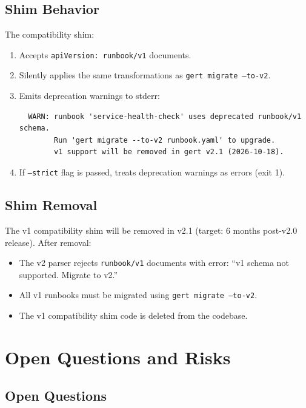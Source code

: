 \subsection{Shim Behavior}

The compatibility shim:
\begin{enumerate}
  \item Accepts \texttt{apiVersion: runbook/v1} documents.
  \item Silently applies the same transformations as \texttt{gert migrate --to-v2}.
  \item Emits deprecation warnings to stderr:
  \begin{verbatim}
  WARN: runbook 'service-health-check' uses deprecated runbook/v1 schema.
        Run 'gert migrate --to-v2 runbook.yaml' to upgrade.
        v1 support will be removed in gert v2.1 (2026-10-18).
  \end{verbatim}
  \item If \texttt{--strict} flag is passed, treats deprecation warnings as errors (exit 1).
\end{enumerate}

\subsection{Shim Removal}

The v1 compatibility shim will be removed in v2.1 (target: 6 months post-v2.0 release). After removal:
\begin{itemize}
  \item The v2 parser rejects \texttt{runbook/v1} documents with error: ``v1 schema not supported. Migrate to v2.''
  \item All v1 runbooks must be migrated using \texttt{gert migrate --to-v2}.
  \item The v1 compatibility shim code is deleted from the codebase.
\end{itemize}

\section{Open Questions and Risks}

\subsection{Open Questions}

